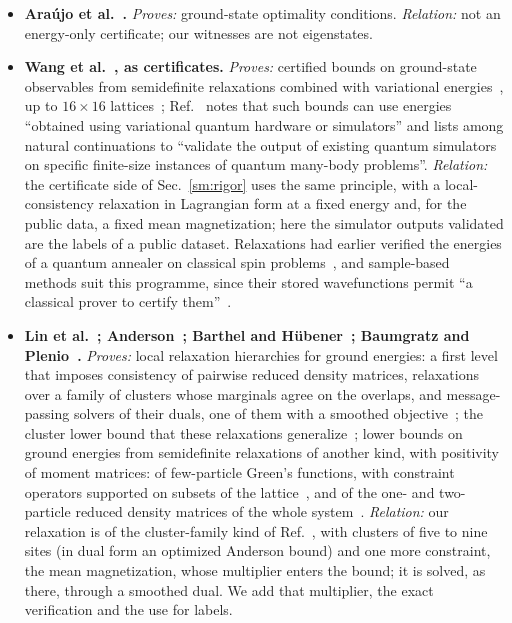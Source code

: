 \documentclass[aps,prx,onecolumn,10pt,nofootinbib,longbibliography,floatfix]{revtex4-2}
\theoremstyle{remark}
\begin{document}
\begin{itemize}
\item \textbf{Ara\'ujo et al.~\cite{araujo2023}.} \emph{Proves:} ground-state optimality conditions. \emph{Relation:} not an energy-only certificate; our witnesses are not eigenstates. %
\item \textbf{Wang et al.~\cite{wang2024prx,wang2026scipost}, as certificates.} \emph{Proves:} certified bounds on ground-state observables from semidefinite relaxations combined with variational energies~\cite{wang2024prx}, up to $16\times16$ lattices~\cite{wang2026scipost}; Ref.~\cite{wang2024prx} notes that such bounds can use energies ``obtained using variational quantum hardware or simulators'' and lists among natural continuations to ``validate the output of existing quantum simulators on specific finite-size instances of quantum many-body problems''. \emph{Relation:} the certificate side of Sec.~\ref{sm:rigor} uses the same principle, with a local-consistency relaxation in Lagrangian form at a fixed energy and, for the public data, a fixed mean magnetization; here the simulator outputs validated are the labels of a public dataset. Relaxations had earlier verified the energies of a quantum annealer on classical spin problems~\cite{baccari2020}, and sample-based methods suit this programme, since their stored wavefunctions permit ``a classical prover to certify them''~\cite{robledo2025}. %
\item \textbf{Lin et al.~\cite{lin2026}; Anderson~\cite{anderson1951}; Barthel and H\"ubener~\cite{barthel2012}; Baumgratz and Plenio~\cite{baumgratz2012}.} \emph{Proves:} local relaxation hierarchies for ground energies: a first level that imposes consistency of pairwise reduced density matrices, relaxations over a family of clusters whose marginals agree on the overlaps, and message-passing solvers of their duals, one of them with a smoothed objective~\cite{lin2026}; the cluster lower bound that these relaxations generalize~\cite{anderson1951}; lower bounds on ground energies from semidefinite relaxations of another kind, with positivity of moment matrices: of few-particle Green's functions, with constraint operators supported on subsets of the lattice~\cite{barthel2012}, and of the one- and two-particle reduced density matrices of the whole system~\cite{baumgratz2012}. \emph{Relation:} our relaxation is of the cluster-family kind of Ref.~\cite{lin2026}, with clusters of five to nine sites (in dual form an optimized Anderson bound) and one more constraint, the mean magnetization, whose multiplier enters the bound; it is solved, as there, through a smoothed dual. We add that multiplier, the exact verification and the use for labels. %

\end{itemize}
\end{document}
